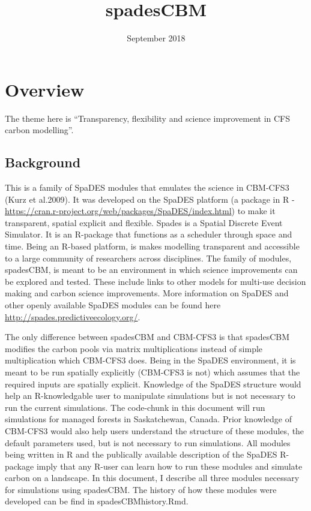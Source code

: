 \documentclass[]{article}
\title{spadesCBM}
\author{}
\date{September 2018}
\begin{document}
\maketitle

\section{Overview}\label{overview}

The theme here is ``Transparency, flexibility and science improvement in
CFS carbon modelling''.

\subsection{Background}\label{background}

This is a family of SpaDES modules that emulates the science in CBM-CFS3
(Kurz et al.2009). It was developed on the SpaDES platform (a package in
R - \url{https://cran.r-project.org/web/packages/SpaDES/index.html}) to
make it transparent, spatial explicit and flexible. Spades is a Spatial
Discrete Event Simulator. It is an R-package that functions as a
scheduler through space and time. Being an R-based platform, is makes
modelling transparent and accessible to a large community of researchers
across disciplines. The family of modules, spadesCBM, is meant to be an
environment in which science improvements can be explored and tested.
These include links to other models for multi-use decision making and
carbon science improvements. More information on SpaDES and other openly
available SpaDES modules can be found here
\url{http://spades.predictiveecology.org/}.

The only difference between spadesCBM and CBM-CFS3 is that spadesCBM
modifies the carbon pools via matrix multiplications instead of simple
multiplication which CBM-CFS3 does. Being in the SpaDES environment, it
is meant to be run spatially explicitly (CBM-CFS3 is not) which assumes
that the required inputs are spatially explicit. Knowledge of the SpaDES
structure would help an R-knowledgable user to manipulate simulations
but is not necessary to run the current simulations. The code-chunk in
this document will run simulations for managed forests in Saskatchewan,
Canada. Prior knowledge of CBM-CFS3 would also help users understand the
structure of these modules, the default parameters used, but is not
necessary to run simulations. All modules being written in R and the
publically available description of the SpaDES R-package imply that any
R-user can learn how to run these modules and simulate carbon on a
landscape. In this document, I describe all three modules necessary for
simulations using spadesCBM. The history of how these modules were
developed can be find in spadesCBMhistory.Rmd.
\end{document}
